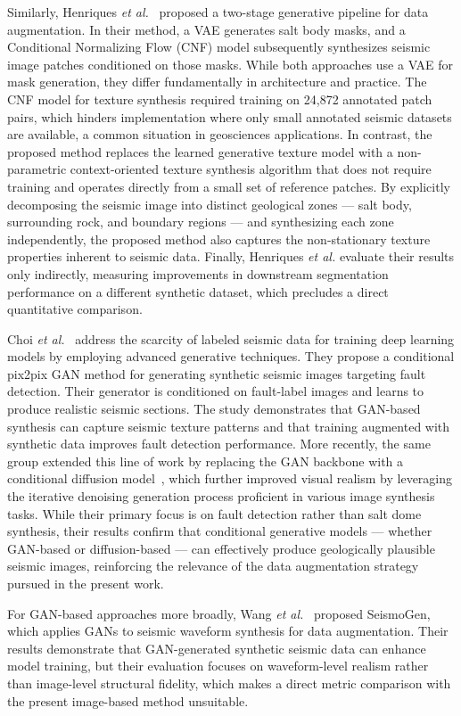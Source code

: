 \documentclass{ieeeaccess}
\begin{document}
Similarly, Henriques \emph{et al.}~\cite{Henriques2021} proposed a two-stage generative pipeline for data augmentation. In their method, a VAE generates salt body masks, and a Conditional Normalizing Flow (CNF) model subsequently synthesizes seismic image patches conditioned on those masks. While both approaches use a VAE for mask generation, they differ fundamentally in architecture and practice. The CNF model for texture synthesis required training on 24,872 annotated patch pairs, which hinders implementation where only small annotated seismic datasets are available, a common situation in geosciences applications. In contrast, the proposed method replaces the learned generative texture model with a non-parametric context-oriented texture synthesis algorithm that does not require training and operates directly from a small set of reference patches. By explicitly decomposing the seismic image into distinct geological zones --- salt body, surrounding rock, and boundary regions --- and synthesizing each zone independently, the proposed method also captures the non-stationary texture properties inherent to seismic data. Finally, Henriques \emph{et al.} evaluate their results only indirectly, measuring improvements in downstream segmentation performance on a different synthetic dataset, which precludes a direct quantitative comparison.

Choi \emph{et al.}~\cite{Choi2025} address the scarcity of labeled seismic data for training deep learning models by employing advanced generative techniques. They propose a conditional pix2pix GAN method for generating synthetic seismic images targeting fault detection. Their generator is conditioned on fault-label images and learns to produce realistic seismic sections. The study demonstrates that GAN-based synthesis can capture seismic texture patterns and that training augmented with synthetic data improves fault detection performance. More recently, the same group extended this line of work by replacing the GAN backbone with a conditional diffusion model~\cite{Choi2025}, which further improved visual realism by leveraging the iterative denoising generation process proficient in various image synthesis tasks. While their primary focus is on fault detection rather than salt dome synthesis, their results confirm that conditional generative models --- whether GAN-based or diffusion-based --- can effectively produce geologically plausible seismic images, reinforcing the relevance of the data augmentation strategy pursued in the present work.

For GAN-based approaches more broadly, Wang \emph{et al.}~\cite{Wang2021} proposed SeismoGen, which applies GANs to seismic waveform synthesis for data augmentation. Their results demonstrate that GAN-generated synthetic seismic data can enhance model training, but their evaluation focuses on waveform-level realism rather than image-level structural fidelity, which makes a direct metric comparison with the present image-based method unsuitable.
\end{document}
